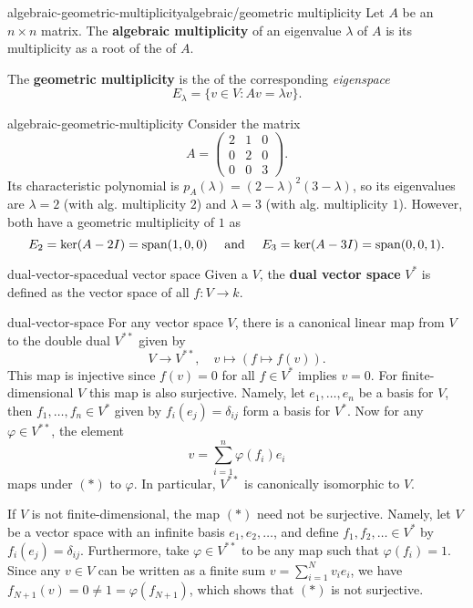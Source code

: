 \begin{topic}{algebraic-geometric-multiplicity}{algebraic/geometric multiplicity}
    Let $A$ be an $n \times n$ matrix. The \textbf{algebraic multiplicity} of an eigenvalue $\lambda$ of $A$ is its multiplicity as a root of the  of $A$.
    
    The \textbf{geometric multiplicity} is the  of the corresponding \textit{eigenspace}
    \[ E_\lambda = \{ v \in V : A v = \lambda v \} . \]
\end{topic}

\begin{example}{algebraic-geometric-multiplicity}
    Consider the matrix
    \[ A = \begin{pmatrix} 2 & 1 & 0 \\ 0 & 2 & 0 \\ 0 & 0 & 3 \end{pmatrix} . \]
    Its characteristic polynomial is $p_A(\lambda) = (2 - \lambda)^2 (3 - \lambda)$, so its eigenvalues are $\lambda = 2$ (with alg. multiplicity $2$) and $\lambda = 3$ (with alg. multiplicity $1$). However, both have a geometric multiplicity of $1$ as
    \[ E_2 = \ker(A - 2I) = \textup{span}(1, 0, 0) \quad \textup{ and } \quad E_3 = \ker(A - 3I) = \textup{span}(0, 0, 1) . \]
\end{example}

\begin{topic}{dual-vector-space}{dual vector space}
    Given a  $V$, the \textbf{dual vector space} $V^*$ is defined as the vector space of all  $f : V \to k$.
\end{topic}

\begin{example}{dual-vector-space}
    For any vector space $V$, there is a canonical linear map from $V$ to the double dual $V^{**}$ given by
    \[ V \to V^{**}, \quad v \mapsto (f \mapsto f(v)) . \tag{$(*)$} \]
    This map is injective since $f(v) = 0$ for all $f \in V^*$ implies $v = 0$. For finite-dimensional $V$ this map is also surjective. Namely, let $e_1, \ldots, e_n$ be a basis for $V$, then $f_1, \ldots, f_n \in V^*$ given by $f_i(e_j) = \delta_{ij}$ form a basis for $V^*$. Now for any $\varphi \in V^{**}$, the element
    \[ v = \sum_{i = 1}^{n} \varphi(f_i) e_i \]
    maps under $(*)$ to $\varphi$. In particular, $V^{**}$ is canonically isomorphic to $V$.
    
    If $V$ is not finite-dimensional, the map $(*)$ need not be surjective. Namely, let $V$ be a vector space with an infinite basis $e_1, e_2, \ldots$, and define $f_1, f_2, \ldots \in V^*$ by $f_i(e_j) = \delta_{ij}$. Furthermore, take $\varphi \in V^{**}$ to be any map such that $\varphi(f_i) = 1$. Since any $v \in V$ can be written as a finite sum $v = \sum_{i = 1}^{N} v_i e_i$, we have $f_{N + 1}(v) = 0 \ne 1 = \varphi(f_{N + 1})$, which shows that $(*)$ is not surjective.
\end{example}

